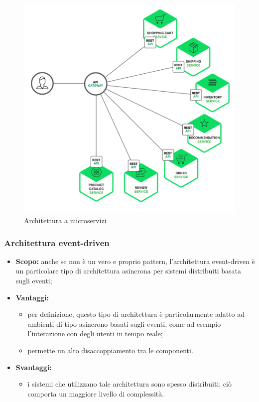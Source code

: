       \begin{figure}[h]
      	\centering
      	\includegraphics[width=\textwidth,height=\textheight,keepaspectratio,scale=0.1]{images/micros.png}
      	\caption{Architettura a microservizi}\label{fig:micr1}
      \end{figure}
      \newpage
    \subsubsection{Architettura event-driven}
      \begin{itemize}
       \item \textbf{Scopo:} anche se non è un vero e proprio pattern, l'architettura event-driven è un particolare tipo di architettura asincrona per sistemi distribuiti basata sugli eventi;
	\item \textbf{Vantaggi:}
	  \begin{itemize}
	   \item per definizione, questo tipo di architettura è particolarmente adatto ad ambienti di tipo asincrono basati sugli eventi, come ad esempio l'interazione con degli utenti in tempo reale;
	   \item permette un alto disaccoppiamento tra le componenti.
	  \end{itemize}
	\item \textbf{Svantaggi:}
	  \begin{itemize}
	   \item i sistemi che utilizzano tale architettura sono spesso distribuiti: ciò comporta un maggiore livello di complessità.
	  \end{itemize}
	\end{itemize}
